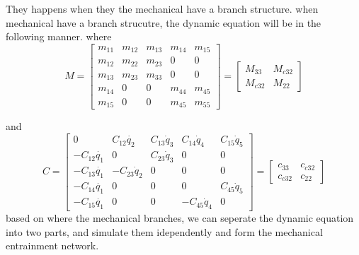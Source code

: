 They happens when they the mechanical have a branch structure.
when mechanical have a branch strucutre,
the dynamic equation will be in the following manner.
where
\[
M=\left[\begin{array}{ccc|cc}
m_{11} & m_{12} & m_{13} & m_{14} & m_{15}\\
m_{12} & m_{22} & m_{23} & 0 & 0\\
m_{13} & m_{23} & m_{33} & 0 & 0\\ \hline
m_{14} & 0 & 0 & m_{44} & m_{45}\\
m_{15} & 0 & 0 & m_{45} & m_{55}\end{array}\right]
=\left[\begin{array}{cc}
M_{33} & M_{c32}\\
M_{c32} & M_{22}\end{array}\right]
\]

and
\[
C=
\left[\begin{array}{ccc|cc}
0 & C_{12}\dot{q_{2}} & C_{13}\dot{q}_{3} & C_{14}\dot{q}_{4} & C_{15}\dot{q}_{5}\\
-C_{12}\dot{q_{1}} & 0 & C_{23}\dot{q}_{3} & 0 & 0\\
-C_{13}\dot{q_{1}} & -C_{23}\dot{q}_{2} & 0 & 0 & 0\\ \hline
-C_{14}\dot{q_{1}} & 0 & 0 & 0 & C_{45}\dot{q}_{5}\\
-C_{15}\dot{q_{1}} & 0 & 0 & -C_{45}\dot{q}_{4} & 0\end{array}\right]
=\left[\begin{array}{cc}
c_{33} & c_{c32}\\
c_{c32} & c_{22}\end{array}\right]
\]
based on where the mechanical branches, we can seperate the dynamic equation into two parts,
and simulate them idependently and form the mechanical entrainment network.



